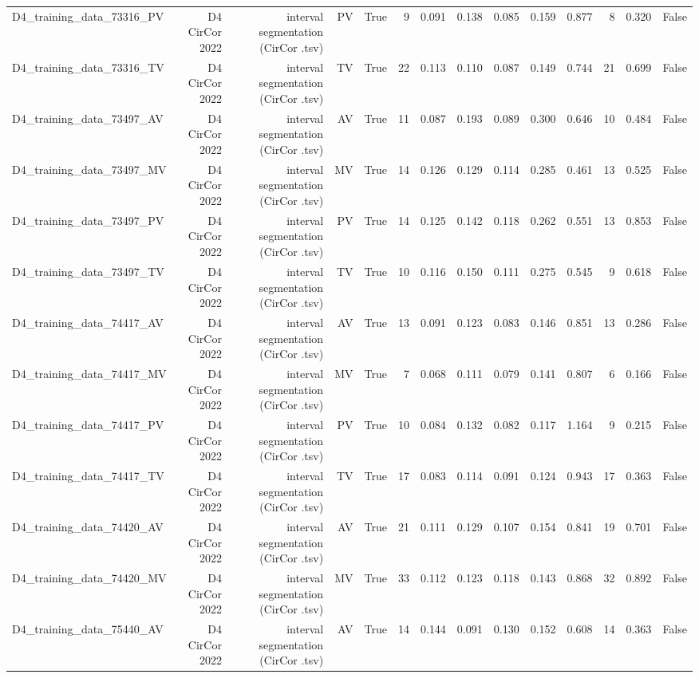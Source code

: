 \begin{table}[htbp]
\begin{tabular}{lrrrrrrrrrrrrr}
    D4\_training\_data\_73316\_PV & D4 CirCor 2022 & interval segmentation (CirCor .tsv) & PV & True & 9 & 0.091 & 0.138 & 0.085 & 0.159 & 0.877 & 8 & 0.320 & False \\
    D4\_training\_data\_73316\_TV & D4 CirCor 2022 & interval segmentation (CirCor .tsv) & TV & True & 22 & 0.113 & 0.110 & 0.087 & 0.149 & 0.744 & 21 & 0.699 & False \\
    D4\_training\_data\_73497\_AV & D4 CirCor 2022 & interval segmentation (CirCor .tsv) & AV & True & 11 & 0.087 & 0.193 & 0.089 & 0.300 & 0.646 & 10 & 0.484 & False \\
    D4\_training\_data\_73497\_MV & D4 CirCor 2022 & interval segmentation (CirCor .tsv) & MV & True & 14 & 0.126 & 0.129 & 0.114 & 0.285 & 0.461 & 13 & 0.525 & False \\
    D4\_training\_data\_73497\_PV & D4 CirCor 2022 & interval segmentation (CirCor .tsv) & PV & True & 14 & 0.125 & 0.142 & 0.118 & 0.262 & 0.551 & 13 & 0.853 & False \\
    D4\_training\_data\_73497\_TV & D4 CirCor 2022 & interval segmentation (CirCor .tsv) & TV & True & 10 & 0.116 & 0.150 & 0.111 & 0.275 & 0.545 & 9 & 0.618 & False \\
    D4\_training\_data\_74417\_AV & D4 CirCor 2022 & interval segmentation (CirCor .tsv) & AV & True & 13 & 0.091 & 0.123 & 0.083 & 0.146 & 0.851 & 13 & 0.286 & False \\
    D4\_training\_data\_74417\_MV & D4 CirCor 2022 & interval segmentation (CirCor .tsv) & MV & True & 7 & 0.068 & 0.111 & 0.079 & 0.141 & 0.807 & 6 & 0.166 & False \\
    D4\_training\_data\_74417\_PV & D4 CirCor 2022 & interval segmentation (CirCor .tsv) & PV & True & 10 & 0.084 & 0.132 & 0.082 & 0.117 & 1.164 & 9 & 0.215 & False \\
    D4\_training\_data\_74417\_TV & D4 CirCor 2022 & interval segmentation (CirCor .tsv) & TV & True & 17 & 0.083 & 0.114 & 0.091 & 0.124 & 0.943 & 17 & 0.363 & False \\
    D4\_training\_data\_74420\_AV & D4 CirCor 2022 & interval segmentation (CirCor .tsv) & AV & True & 21 & 0.111 & 0.129 & 0.107 & 0.154 & 0.841 & 19 & 0.701 & False \\
    D4\_training\_data\_74420\_MV & D4 CirCor 2022 & interval segmentation (CirCor .tsv) & MV & True & 33 & 0.112 & 0.123 & 0.118 & 0.143 & 0.868 & 32 & 0.892 & False \\
    D4\_training\_data\_75440\_AV & D4 CirCor 2022 & interval segmentation (CirCor .tsv) & AV & True & 14 & 0.144 & 0.091 & 0.130 & 0.152 & 0.608 & 14 & 0.363 & False \\

\end{tabular}
\end{table}
